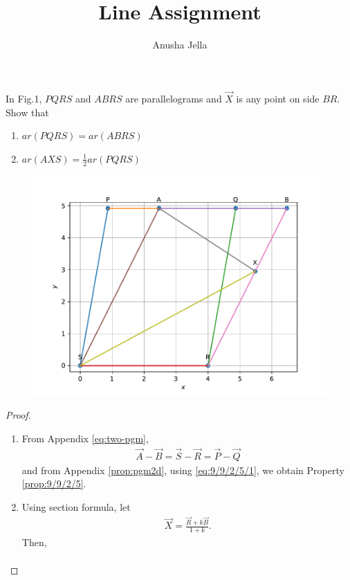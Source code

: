 \documentclass{article}
\title{Line Assignment}
\author{Anusha Jella}
\begin{document}
\maketitle
\begin{multicols}{2}
	\fi
In Fig.1, $PQRS$ and $ABRS$ are parallelograms
and $\vec{X}$ is any point on side $BR$. Show that  
\begin{enumerate}
    \item $ar (PQRS) = ar(ABRS)$
	    \label{prop:9/9/2/5}
    \item $ar(AXS) = \frac{1}{2} ar(PQRS)$
\end{enumerate}
	\begin{figure}[!h]
		\centering
 \includegraphics[width=\columnwidth]{chapters/9/9/2/5/figs/parallelogram1.pdf}
		\caption{}
		\label{fig:9/9/2/5}
  	\end{figure}
	\begin{proof}
		\begin{enumerate}
			\item 
		From Appendix
	  \ref{eq:two-pgm},
  \begin{align}
 \vec{A}-\vec{B} = \vec{S} -\vec{R} = \vec{P}-\vec{Q}
		\label{eq:9/9/2/5/1}
  \end{align}
  and from Appendix
  \ref{prop:pgm2d}, using 
		\eqref{eq:9/9/2/5/1}, we obtain Property
	    \ref{prop:9/9/2/5}.
    \item Using section formula, let 
  \begin{align}
	\vec{X} =   \frac{\vec{R}+k\vec{B}}{1+k}.
  \end{align}
  Then, 
  \begin{align}

\end{align}
\end{enumerate}
\end{proof}
\end{multicols}
\end{document}
